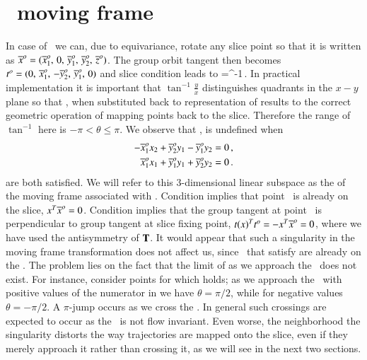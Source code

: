 \section{\CLe\ moving frame}

In case of \cLe\ we can, due to equivariance, rotate any slice point so that it is written as 
${\overline{x}^o}=({\overline{x}^o_{1}},\,0,\,{\overline{y}^o_{1}},\,{\overline{y}^o_{2}},\,{\overline{z}^o_{}})$.
The group orbit tangent then becomes  
$t^o_{}=(0,\,{\overline{x}^o_{1}},\,-{\overline{y}^o_{2}},\,{\overline{y}^o_{1}},\,0)$
and slice condition  leads to 
\beq
  \theta=\tan^{-1}\,.
In practical implementation it is important that $\tan^{-1}\frac{y}{x}$ distinguishes quadrants 
in the $x-y$ plane so that , when substituted back to representation  of   
results to the correct geometric operation of mapping points back to the slice.
Therefore the range of $\tan^{-1}$ here is $-\pi<\theta\leq\pi$. We observe that , 
is undefined when 
\begin{subequations}\label{cLeMFsing}
  \begin{align}
    -\slicepComp{x}{1}x_2+\slicepComp{y}{2}y_1-\slicepComp{y}{1}y_2 &=0 \label{cLeMFsingOnSlice}\cont 
    \slicepComp{x}{1}x_1+\slicepComp{y}{1}y_1+\slicepComp{y}{2}y_2 &=0 \label{cLeMFsingPerpTan}\,.
  \end{align}  
\end{subequations}
are both satisfied. We will refer to this $3$-dimensional linear subspace as the \emph{\sset} of the moving
frame associated with . Condition  implies that point \ssp\ is already 
on the slice, $x^T{\overline{x}^o}=0$. Condition  implies that the group tangent 
at point \ssp\ is perpendicular to group tangent at slice fixing point, 
$t{}(x)^Tt^o_{}=-x^T{\overline{x}^o}=0$, where we have used the antisymmetry of $\mathbf{T}$.
It would appear that such a singularity in the moving frame transformation does not affect us, 
since \ssp\ that satisfy  are already on the \slice. The problem lies on the fact 
that the limit of  as we approach the \sset\ does not exist. 
For instance, consider points for which 
holds; as we approach the \sset\ with positive values of the numerator in  
we have $\theta=\pi/2$, while for negative values $\theta=-\pi/2$. A $\pi$-jump occurs as 
we cross the \sset. In general such crossings are expected to occur as the \sset\ is not
flow invariant. Even worse, the neighborhood the singularity distorts the way trajectories
are mapped onto the slice, even if they merely approach it rather than crossing it, as we
will see in the next two sections.

